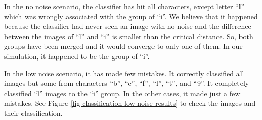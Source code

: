 In the no noise scenario, the classifier has hit all characters, except letter ``l'' which was wrongly associated with the group of ``i''. We believe that it happened because the classifier had never seen an image with no noise and the difference between the images of ``l'' and ``i'' is smaller than the critical distance. So, both groups have been merged and it would converge to only one of them. In our simulation, it happened to be the group of ``i''.

In the low noise scenario, it has made few mistakes. It correctly classified all images but some from characters ``b'', ``e'', ``f'', ``l'', ``t'', and ``9''. It completely classified ``l'' images to the ``i'' group. In the other cases, it made just a few mistakes. See Figure \ref{fig-classification-low-noise-results} to check the images and their classification.

